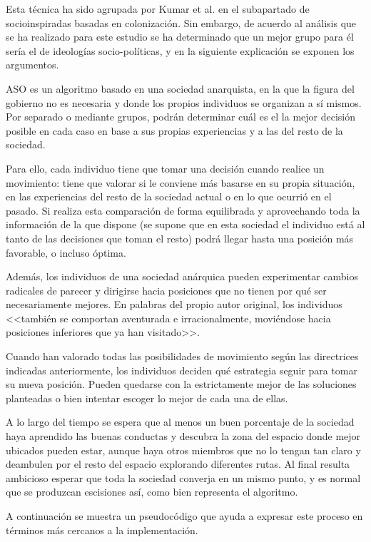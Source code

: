 Esta técnica ha sido agrupada por Kumar et al. \cite{socio-evolution-algorithm} en el subapartado de socioinspiradas basadas en colonización. Sin embargo, de acuerdo al análisis que se ha realizado para este estudio se ha determinado que un mejor grupo para él sería el de ideologías socio-políticas, y en la siguiente explicación se exponen los argumentos.

ASO es un algoritmo basado en una sociedad anarquista, en la que la figura del gobierno no es necesaria y donde los propios individuos se organizan a sí mismos. Por separado o mediante grupos, podrán determinar cuál es el la mejor decisión posible en cada caso en base a sus propias experiencias y a las del resto de la sociedad.

Para ello, cada individuo tiene que tomar una decisión cuando realice un movimiento: tiene que valorar si le conviene más basarse en su propia situación, en las experiencias del resto de la sociedad actual o en lo que ocurrió en el pasado. Si realiza esta comparación de forma equilibrada y aprovechando toda la información de la que dispone (se supone que en esta sociedad el individuo está al tanto de las decisiones que toman el resto) podrá llegar hasta una posición más favorable, o incluso óptima.

Además, los individuos de una sociedad anárquica pueden experimentar cambios radicales de parecer y dirigirse hacia posiciones que no tienen por qué ser necesariamente mejores. En palabras del propio autor original, los individuos <<también se comportan aventurada e irracionalmente, moviéndose hacia posiciones inferiores que ya han visitado>>. 

Cuando han valorado todas las posibilidades de movimiento según las directrices indicadas anteriormente, los individuos deciden qué estrategia seguir para tomar su nueva posición. Pueden quedarse con la estrictamente mejor de las soluciones planteadas o bien intentar escoger lo mejor de cada una de ellas.

A lo largo del tiempo se espera que al menos un buen porcentaje de la sociedad haya aprendido las buenas conductas y descubra la zona del espacio donde mejor ubicados pueden estar, aunque haya otros miembros que no lo tengan tan claro y deambulen por el resto del espacio explorando diferentes rutas. Al final resulta ambicioso esperar que toda la sociedad converja en un mismo punto, y es normal que se produzcan escisiones así, como bien representa el algoritmo.

A continuación se muestra un pseudocódigo que ayuda a expresar este proceso en términos más cercanos a la implementación.

